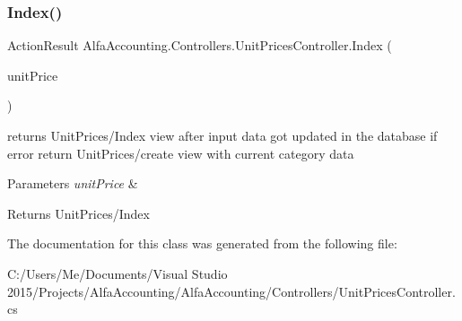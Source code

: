 \subsubsection{\texorpdfstring{Index()}{Index()}\hspace{0.1cm}{\footnotesize\ttfamily [2/2]}}
{\footnotesize\ttfamily Action\+Result Alfa\+Accounting.\+Controllers.\+Unit\+Prices\+Controller.\+Index (\begin{DoxyParamCaption}\item[{\mbox{[}\+Bind(\+Include = \char`\"{}\+Unit\+Price\+Id,\+Unit\+Price\+Value,\+Unit\+Price\+Description\char`\"{})\mbox{]} Unit\+Price}]{unit\+Price }\end{DoxyParamCaption})}



returns Unit\+Prices/\+Index view after input data got updated in the database if error return Unit\+Prices/create view with current category data 


\begin{DoxyParams}{Parameters}
{\em unit\+Price} & \\
\hline
\end{DoxyParams}
\begin{DoxyReturn}{Returns}
Unit\+Prices/\+Index 
\end{DoxyReturn}


The documentation for this class was generated from the following file\+:\begin{DoxyCompactItemize}
\item 
C\+:/\+Users/\+Me/\+Documents/\+Visual Studio 2015/\+Projects/\+Alfa\+Accounting/\+Alfa\+Accounting/\+Controllers/Unit\+Prices\+Controller.\+cs\end{DoxyCompactItemize}
